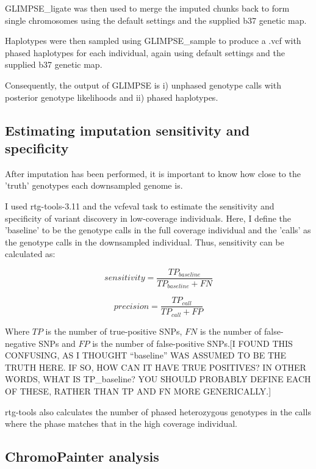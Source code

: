 GLIMPSE\_ligate was then used to merge the imputed chunks back to form single chromosomes using the default settings and the supplied b37 genetic map. 

Haplotypes were then sampled using GLIMPSE\_sample to produce a .vcf with phased haplotypes for each individual, again using default settings and the supplied b37 genetic map. 

Consequently, the output of GLIMPSE is i) unphased genotype calls with posterior genotype likelihoods and ii) phased haplotypes.

\subsection{Estimating imputation sensitivity and specificity}

After imputation has been performed, it is important to know how close to the 'truth' genotypes each downsampled genome is. 

I used rtg-tools-3.11 \cite{cleary2014joint} and the vcfeval task to estimate the sensitivity and specificity of variant discovery in low-coverage individuals. Here, I define the 'baseline' to be the genotype calls in the full coverage individual and the 'calls' as the genotype calls in the downsampled individual. Thus, sensitivity can be calculated as: 

\begin{equation}
sensitivity = \frac{TP_{baseline}}{TP_{baseline} + FN}
\end{equation}

\begin{equation}
precision = \frac{TP_{call}}{TP_{call} + FP}
\end{equation}

Where $TP$ is the number of true-positive SNPs, $FN$ is the number of false-negative SNPs and $FP$ is the number of false-positive SNPs.{\color{red}[I FOUND THIS CONFUSING, AS I THOUGHT ``baseline'' WAS ASSUMED TO BE THE TRUTH HERE. IF SO, HOW CAN IT HAVE TRUE POSITIVES? IN OTHER WORDS, WHAT IS TP\_baseline? YOU SHOULD PROBABLY DEFINE EACH OF THESE, RATHER THAN TP AND FN MORE GENERICALLY.]}

rtg-tools also calculates the number of phased heterozygous genotypes in the calls where the phase matches that in the high coverage individual. 


\subsection{ChromoPainter analysis} \label{ChromoPainter_analysis}

